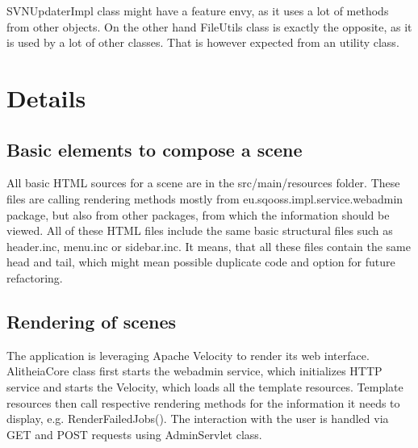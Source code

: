 \documentclass[a4paper,11pt,titlepage]{article}
\begin{document}
%

SVNUpdaterImpl class might have a feature envy, as it uses a lot of methods from other objects. On the other hand FileUtils class is exactly the opposite, as it is used by a lot of other classes. That is however expected from an utility class.

\section{Details}
\subsection{Basic elements to compose a scene}
All basic HTML sources for a scene are in the src/main/resources folder. These files are calling rendering methods mostly from eu.sqooss.impl.service.webadmin package, but also from other packages, from which the information should be viewed. All of these HTML files include the same basic structural files such as header.inc, menu.inc or sidebar.inc. It means, that all these files contain the same head and tail, which might mean possible duplicate code and option for future refactoring.

\subsection{Rendering of scenes}
The application is leveraging Apache Velocity to render its web interface. AlitheiaCore class first starts the webadmin service, which initializes HTTP service and starts the Velocity, which loads all the template resources. Template resources then call respective rendering methods for the information it needs to display, e.g. RenderFailedJobs(). The interaction with the user is handled via GET and POST requests using AdminServlet class.
%
\end{document}
